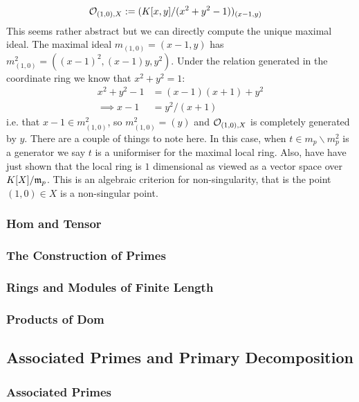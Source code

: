 \begin{equation*}
    \begin{split}
        \mathcal{O}_{(1,0), X} &:= (K[x,y]/(x^2 + y^2 - 1))_{(x- 1, y)} 
    \end{split}
\end{equation*}
This seems rather abstract but we can directly compute the unique maximal ideal. The maximal ideal $m_{(1,0)} = (x - 1, y)$ has $m_{(1,0)}^2 = ((x-1)^2, (x-1)y, y^2)$. Under the relation generated in the coordinate ring we know that $x^2 + y^2 = 1$:
\begin{equation*}
    \begin{split}
        x^2 + y^2 - 1 &= (x-1)(x+1) + y^2 \\
        \implies x - 1 &= y^2/(x+1)
    \end{split}
\end{equation*}
i.e. that $x-1\in m_{(1,0)}^2$, so $m_(1,0)^2 = (y)$ and $\mathcal{O}_{(1,0), X}$ is completely generated by $y$. There are a couple of things to note here. In this case, when $t \in m_p \backslash m_p^2$ is a generator we say $t$ is a uniformiser for the maximal local ring. Also, have have just shown that the local ring is $1$ dimensional as viewed as a vector space over $K[X]/\mathfrak{m}_p$. This is an algebraic criterion for non-singularity, that is the point $(1,0) \in X$ is a non-singular point. 



\subsubsection{Hom and Tensor}
\subsubsection{The Construction of Primes}
\subsubsection{Rings and Modules of Finite Length}
\subsubsection{Products of Dom}

\subsection{Associated Primes and Primary Decomposition}
\subsubsection{Associated Primes}
